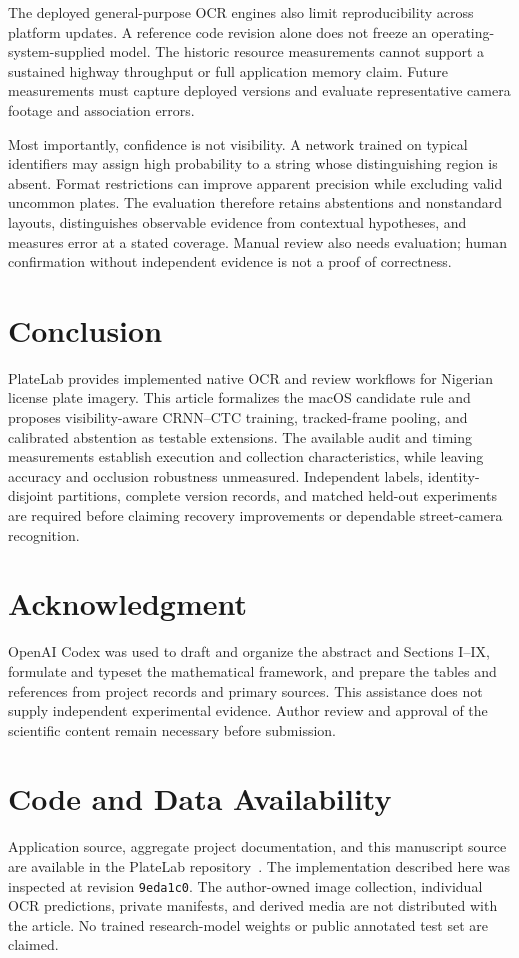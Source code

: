 \documentclass[journal]{IEEEtran}
\begin{document}
The deployed general-purpose OCR engines also limit reproducibility across platform updates. A reference code revision alone does not freeze an operating-system-supplied model. The historic resource measurements cannot support a sustained highway throughput or full application memory claim. Future measurements must capture deployed versions and evaluate representative camera footage and association errors.

Most importantly, confidence is not visibility. A network trained on typical identifiers may assign high probability to a string whose distinguishing region is absent. Format restrictions can improve apparent precision while excluding valid uncommon plates. The evaluation therefore retains abstentions and nonstandard layouts, distinguishes observable evidence from contextual hypotheses, and measures error at a stated coverage. Manual review also needs evaluation; human confirmation without independent evidence is not a proof of correctness.

\section{Conclusion}
PlateLab provides implemented native OCR and review workflows for Nigerian license plate imagery. This article formalizes the macOS candidate rule and proposes visibility-aware CRNN--CTC training, tracked-frame pooling, and calibrated abstention as testable extensions. The available audit and timing measurements establish execution and collection characteristics, while leaving accuracy and occlusion robustness unmeasured. Independent labels, identity-disjoint partitions, complete version records, and matched held-out experiments are required before claiming recovery improvements or dependable street-camera recognition.

\section*{Acknowledgment}
OpenAI Codex was used to draft and organize the abstract and Sections I--IX, formulate and typeset the mathematical framework, and prepare the tables and references from project records and primary sources. This assistance does not supply independent experimental evidence. Author review and approval of the scientific content remain necessary before submission.

\section*{Code and Data Availability}
Application source, aggregate project documentation, and this manuscript source are available in the PlateLab repository~\cite{platelab}. The implementation described here was inspected at revision \texttt{9eda1c0}. The author-owned image collection, individual OCR predictions, private manifests, and derived media are not distributed with the article. No trained research-model weights or public annotated test set are claimed.
\end{document}
